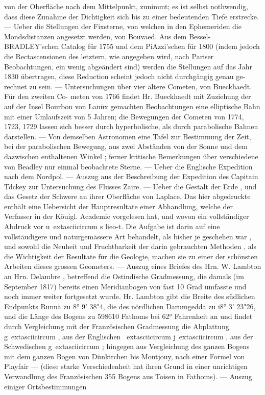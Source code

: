 \documentclass[12pt,a4paper]{article}
\begin{document}
{{{{{{{{von  der  Oberfläche  nach  dem  Mittelpunkt,  zunimmt;  es  ist  selbst  nothwendig,  dass  diese  Zunahme  der Dichtigkeit  sich  bis  zu  einer  bedeutenden  Tiefe  erstrecke.  ---  Ueber  die  Stellungen  der  Fixsterne,  von welchen  in  den  Ephemeriden  die  Mondsdistanzen  angesetzt  werden,  von  Bouvaed.  Aus  dem  Bessel- BRADLEY'schen  Catalog  für  1755  und  dem  PiAzzi'schen  für  1800  (indem  jedoch  die  Rectascensionen  des letztern,  wie  angegeben  wird,  nach  Pariser  Beobachtungen,  ein  wenig  abgeändert  sind)  werden  die Stellungen  auf  das  Jahr  1830  übertragen,  diese  Reduction  scheint  jedoch  nicht  durchgängig  genau  ge- rechnet zu  sein.  ---  Untersuchungen  über  vier  ältere  Cometen,  von  Bueckhaedt.  Für  den  zweiten  Co- meten  von  1766  findet  Hr.  Bueckhaedt  mit  Zuziehung  der  auf  der  Insel  Bourbon  von  Lanüx  gemachten Beobachtungen  eine  elliptische  Bahn  mit  einer  Umlaufszeit  von  5  Jahren;  die  Bewegungen  der  Cometen von  1774,  1723,  1729  lassen  sich  besser  durch  hyperbolische,  als  durch  parabolische  Bahnen  darstellen. --- Von  demselben  Astronomen  eine  Tafel  zur  Bestimmung  der  Zeit,  bei  der  parabolischen  Bewegung,  aus zwei  Abständen  von  der  Sonne  und  dem  dazwischen  enthaltenen  Winkel ;  ferner  kritische  Bemerkungen über  verschiedene  von  Beadley  nur  einmal  beobachtete  Sterne.  ---  Ueber  die  Englische  Expedition  nach dem  Nordpol.  ---  Auszug  aus  der  Beschreibung  der  Expedition  des  Capitain  Tdckey  zur  Untersuchung des  Flusses  Zaire.  ---  Ueber  die  Gestalt  der  Erde ,  und  das  Gesetz  der  Schwere  an  ihrer  Oberfläche  von Laplace.  Das  hier  abgedruckte  enthält  eine  Uebersicht  der  Hauptresultate  einer  Abhandlung,  welche der  Verfasser  in  der  Köuigl.  Academie  vorgelesen  hat,  und  wovon  ein  vollständiger  Abdruck  vor  u\	extasciicircum{}{ }s lieo-t.  Die  Aufgabe  ist  darin  auf  eine  vollstäudigere  und  naturgemässere  Art  behandelt,  als  bisher  je geschehen  war ,  und  sowohl  die  Neuheit  und  Fruchtbarkeit  der  darin  gebrauchten  Methoden ,  als  die Wichtigkeit  der  Resultate  für  die  Geologie,  machen  sie  zu  einer  der  schönsten  Arbeiten  dieses  grossen Geometers.  ---  Auszug  eines  Briefes  des  Hrn.  W.  Lambton  an  Hrn.  Delambre  ,  betreffend  die  Ostindische Gradmessung,  die  damals  (im  September  1817)  bereits  einen  Meridianbogen  von  fast  10  Grad  umfasste und  noch  immer  weiter  fortgesetzt  wurde.  Hr.  Lambton  gibt  die  Breite  des  südlichen  Endpunkts  Runnä zu  8°  9'  38"4,  die  des  nördlichen  Darumgedda  zu  i8°  3'  23"26,  und  die  Länge  des  Bogens  zu  598610 Fathoms  bei  62°  Fahrenheit  an  und  findet  durch  Vergleichung  mit  der  Französischen  Gradmessung  die Abplattung  g\	extasciicircum{}{ },  aus  der  Englischen  \	extasciicircum{}{ }j\	extasciicircum{}{ },  aus  der  Schwedischen  g\	extasciicircum{}{ };  hingegen  aus  Vergleichung  des ganzen  Bogens  mit  dem  ganzen  Bogen  von  Dünkirchen  bis  Montjouy,  nach  einer  Formel  von  Playfair ---  (diese  starke  Verschiedenheit  hat  ihren  Grund  in  einer  unrichtigen  Verwandlung   des   Französischen 355 Bogens  aus  Toisen  in  Fathoms).  ---  Auszug  einiger  Ortsbestimmungen }}}}}}}}
\end{document}
